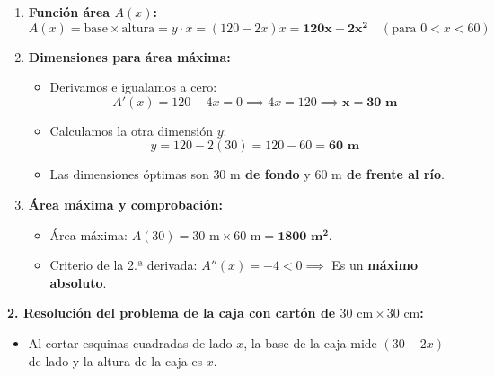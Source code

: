 ﻿\documentclass[11pt,a4paper]{article}
\begin{document}
\begin{enumerate}[label=\textbf{\alph*)}, leftmargin=2em, itemsep=4pt]
    \item \textbf{Función área $A(x)$:}
    \[
    A(x) = \text{base} \times \text{altura} = y \cdot x = (120 - 2x)x = \mathbf{120x - 2x^2} \quad (\text{para } 0 < x < 60)
    \]

    \item \textbf{Dimensiones para área máxima:}
    \begin{itemize}[leftmargin=1.5em, itemsep=2pt]
        \item Derivamos e igualamos a cero:
        \[
        A'(x) = 120 - 4x = 0 \implies 4x = 120 \implies \mathbf{x = 30\text{ m}}
        \]
        \item Calculamos la otra dimensión $y$:
        \[
        y = 120 - 2(30) = 120 - 60 = \mathbf{60\text{ m}}
        \]
        \item Las dimensiones óptimas son \textbf{$30\text{ m}$ de fondo} y \textbf{$60\text{ m}$ de frente al río}.
    \end{itemize}

    \item \textbf{Área máxima y comprobación:}
    \begin{itemize}[leftmargin=1.5em, itemsep=2pt]
        \item Área máxima: $A(30) = 30\text{ m} \times 60\text{ m} = \mathbf{1800\text{ m}^2}$.
        \item Criterio de la 2.ª derivada: $A''(x) = -4 < 0 \implies$ Es un \textbf{máximo absoluto}.
    \end{itemize}
\end{enumerate}

\vspace{0.3cm}
\noindent\textbf{2. Resolución del problema de la caja con cartón de $30\text{ cm} \times 30\text{ cm}$:}

\begin{itemize}[leftmargin=1.5em, itemsep=2pt]
    \item Al cortar esquinas cuadradas de lado $x$, la base de la caja mide $(30 - 2x)$ de lado y la altura de la caja es $x$.
\end{itemize}
\end{document}
